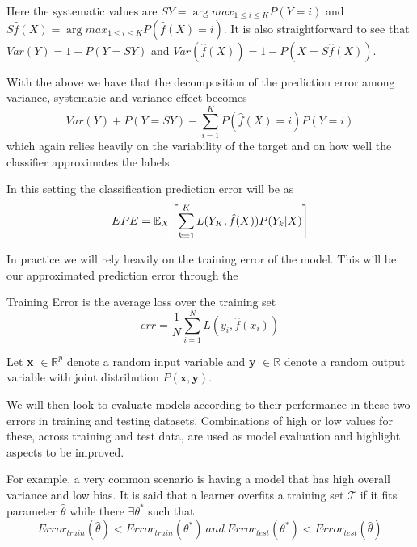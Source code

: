 Here the systematic values are  $SY = \arg max_{1\leq i \leq K} P(Y=i)$ and $S\hat{f}(X) = \arg max_{1\leq i \leq K} P(\hat{f}(X)=i)$. It is also straightforward to see that $Var(Y) = 1 - P(Y=SY)$ and $Var(\hat{f}(X)) = 1 -  P(X = S\hat{f}(X)) $.

With the above we have that the decomposition of the prediction error among variance, systematic and variance effect becomes
$$Var(Y) + P(Y=SY)  - \sum_{i=1}^K P(\hat{f}(X) =i)P(Y=i)$$ which again relies heavily on the variability of the target and on how well the classifier approximates the labels.


In this setting the classification prediction error will be as
\begin{equation}\label{classificationEPE}
EPE = \operatorname{\mathbb{E}}_X\left[ \sum_{k=1}^{K} L( Y_K , \hat{f}(X) ) P(Y_k|X) \right]
\end{equation}


In practice we will rely heavily on the training error of the model. This will be our approximated prediction error through the
\begin{definition}{Training Error}
is the average loss over the training set
$$ \overline{err} = \frac{1}{N} \sum_{i=1}^N L(y_i, \hat{f}(x_i) )$$
\end{definition}


Let \textbf{x} $\in \mathbb{R}^{p}$ denote a random input variable and \textbf{y}  $\in \mathbb{R}$ denote a random output variable with joint distribution $P\left(\textbf{x},\textbf{y}\right)$.


We will then look to evaluate models according to their performance in these two errors in training and testing datasets. Combinations of high or low values for these, across training and test data, are used as model evaluation and highlight aspects to be improved.

For example, a very common scenario is having a model that has high overall variance and low bias.
It is said that a learner overfits a training set $\mathcal{T}$ if it fits parameter $\hat{\theta}$ while there $\exists \theta^*$ such that
\begin{equation} \label{eq:overfitting}
Error_{train}(\hat{\theta}) < Error_{train}(\theta^*) \  and \ Error_{test}(\theta^*) < Error_{test}(\hat{\theta})
\end{equation}

